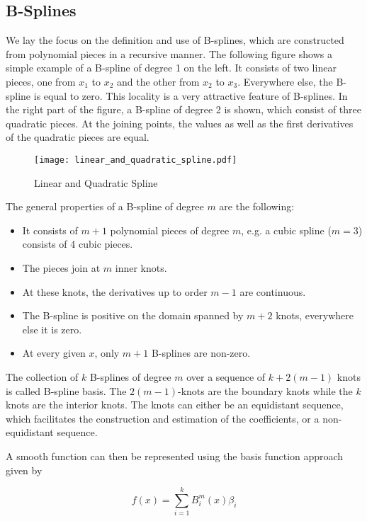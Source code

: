 \subsection{B-Splines}

We lay the focus on the definition and use of B-splines, which are constructed from polynomial pieces in a recursive manner. The following figure shows a simple example of a B-spline of degree 1 on the left. It consists of two linear pieces, one from $x_1$ to $x_2$ and the other from $x_2$ to $x_3$. Everywhere else, the B-spline is equal to zero. This locality is a very attractive feature of B-splines. In the right part of the figure, a B-spline of degree 2 is shown, which consist of three quadratic pieces. At the joining points, the values as well as the first derivatives of the quadratic pieces are equal. 

\begin{figure}[H]
	\centering
	\texttt{[image: linear\_and\_quadratic\_spline.pdf]}
	\caption{Linear and Quadratic Spline}
	\label{fig:lin_and_quad_spline}
\end{figure}


The general properties of a B-spline of degree $m$ are the following:

\begin{itemize}
	\item It consists of $m+1$ polynomial pieces of degree $m$, e.g. a cubic spline ($m=3$) consists of 4 cubic pieces.
	\item The pieces join at $m$ inner knots.
	\item At these knots, the derivatives up to order $m-1$ are continuous.
	\item The B-spline is positive on the domain spanned by $m+2$ knots, everywhere else it is zero.
	\item At every given $x$, only $m+1$ B-splines are non-zero.
\end{itemize}

The collection of $k$ B-splines of degree $m$ over a sequence of $k+2(m-1)$ knots is called B-spline basis. The $2(m-1)$-knots are the boundary knots while the $k$ knots are the interior knots. The knots can either be an equidistant sequence, which facilitates the construction and estimation of the coefficients, or a non-equidistant sequence.

A smooth function can then be represented using the basis function approach given by

$$f(x) = \sum_{i=1}^k B_i^m(x) \beta_i $$

